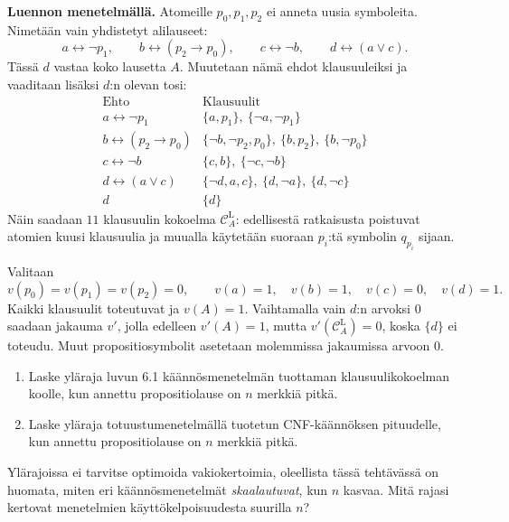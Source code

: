 \documentclass[11pt,a4paper]{amsart}
\begin{document}
\begin{solution}
  \textbf{Luennon menetelmällä.}
  Atomeille \(p_0,p_1,p_2\) ei anneta uusia symboleita.
  Nimetään vain yhdistetyt alilauseet:
  \[
    a\leftrightarrow\neg p_1,\qquad
    b\leftrightarrow(p_2\to p_0),\qquad
    c\leftrightarrow\neg b,\qquad
    d\leftrightarrow(a\lor c).
  \]
  Tässä \(d\) vastaa koko lausetta \(A\). Muutetaan nämä ehdot
  klausuuleiksi ja vaaditaan lisäksi \(d\):n olevan tosi:
  \[
    \begin{array}{c|l}
      \text{Ehto} & \text{Klausuulit}\\ \hline
      a\leftrightarrow\neg p_1
      & \{a,p_1\},\ \{\neg a,\neg p_1\}\\
      b\leftrightarrow(p_2\to p_0)
      & \{\neg b,\neg p_2,p_0\},\ \{b,p_2\},\ \{b,\neg p_0\}\\
      c\leftrightarrow\neg b
      & \{c,b\},\ \{\neg c,\neg b\}\\
      d\leftrightarrow(a\lor c)
      & \{\neg d,a,c\},\ \{d,\neg a\},\ \{d,\neg c\}\\
      d & \{d\}
    \end{array}
  \]
  Näin saadaan \(11\) klausuulin kokoelma \(\mathcal C_A^{\mathrm L}\):
  edellisestä ratkaisusta poistuvat atomien kuusi klausuulia ja
  muualla käytetään suoraan \(p_i\):tä symbolin \(q_{p_i}\) sijaan.

  Valitaan
  \[
    v(p_0)=v(p_1)=v(p_2)=0,\qquad
    v(a)=1,\quad v(b)=1,\quad v(c)=0,\quad v(d)=1.
  \]
  Kaikki klausuulit toteutuvat ja \(v(A)=1\).
  Vaihtamalla vain \(d\):n arvoksi \(0\) saadaan jakauma \(v'\),
  jolla edelleen \(v'(A)=1\), mutta
  \(v'(\mathcal C_A^{\mathrm L})=0\), koska \(\{d\}\) ei toteudu.
  Muut propositiosymbolit asetetaan molemmissa jakaumissa arvoon \(0\).
\end{solution}

\newpage

\begin{exercise}
  \leavevmode\par
\begin{enumerate}[label=\alph*), nosep]
  \item Laske yläraja luvun 6.1 käännösmenetelmän tuottaman
    klausuulikokoelman koolle, kun annettu propositiolause on \(n\)
    merkkiä pitkä.
  \item Laske yläraja totuustumenetelmällä tuotetun CNF-käännöksen
    pituudelle, kun annettu propositiolause on \(n\) merkkiä pitkä.
\end{enumerate}
Ylärajoissa ei tarvitse optimoida vakiokertoimia, oleellista tässä
tehtävässä on huomata, miten eri käännösmenetelmät \emph{skaalautuvat},
kun \(n\) kasvaa. Mitä rajasi kertovat menetelmien käyttökelpoisuudesta
suurilla \(n\)?
\end{exercise}
\end{document}
